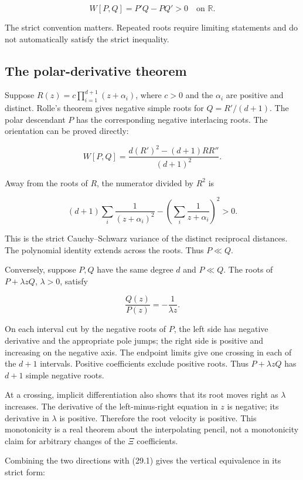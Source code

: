 \documentclass[
  10pt,
  a4paper,
  10pt,
  oneside,
  openany]{book}
\begin{document}
\[
 W[P,Q]=P'Q-PQ'>0\quad\text{on }\mathbb R.
\]

The strict convention matters. Repeated roots require limiting
statements and do not automatically satisfy the strict inequality.

\subsection{The polar-derivative
theorem}\label{the-polar-derivative-theorem}

Suppose \(R(z)=c\prod_{i=1}^{d+1}(z+\alpha_i)\), where \(c>0\) and the
\(\alpha_i\) are positive and distinct. Rolle's theorem gives negative
simple roots for \(Q=R'/(d+1)\). The polar descendant \(P\) has the
corresponding negative interlacing roots. The orientation can be proved
directly:

\[
 W[P,Q]=\frac{d(R')^2-(d+1)RR''}{(d+1)^2}.
 \tag{29.2}\label{eq:29.2}
\]

Away from the roots of \(R\), the numerator divided by \(R^2\) is

\[
 (d+1)\sum_i\frac1{(z+\alpha_i)^2}
 -\left(\sum_i\frac1{z+\alpha_i}\right)^2>0.
\]

This is the strict Cauchy--Schwarz variance of the distinct reciprocal
distances. The polynomial identity extends across the roots. Thus
\(P\ll Q\).

Conversely, suppose \(P,Q\) have the same degree \(d\) and \(P\ll Q\).
The roots of \(P+\lambda zQ\), \(\lambda>0\), satisfy

\[
 \frac{Q(z)}{P(z)}=-\frac1{\lambda z}.
 \tag{29.3}\label{eq:29.3}
\]

On each interval cut by the negative roots of \(P\), the left side has
negative derivative and the appropriate pole jumps; the right side is
positive and increasing on the negative axis. The endpoint limits give
one crossing in each of the \(d+1\) intervals. Positive coefficients
exclude positive roots. Thus \(P+\lambda zQ\) has \(d+1\) simple
negative roots.

At a crossing, implicit differentiation also shows that its root moves
right as \(\lambda\) increases. The derivative of the left-minus-right
equation in \(z\) is negative; its derivative in \(\lambda\) is
positive. Therefore the root velocity is positive. This monotonicity is
a real theorem about the interpolating pencil, not a monotonicity claim
for arbitrary changes of the \(\Xi\) coefficients.

Combining the two directions with (29.1) gives the vertical equivalence
in its strict form:
\end{document}
